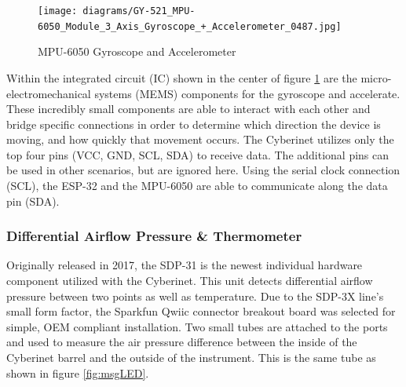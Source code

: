 \begin{center}
    \begin{figure}
        \centering
        \texttt{[image: diagrams/GY-521\_MPU-6050\_Module\_3\_Axis\_Gyroscope\_+\_Accelerometer\_0487.jpg]}
        \caption{MPU-6050 Gyroscope and Accelerometer}
        \label{fig:6050}
    \end{figure}
\end{center}

Within the integrated circuit (IC) shown in the center of figure \ref{fig:6050} are the micro-electromechanical systems (MEMS) components for the gyroscope and accelerate. These incredibly small components are able to interact with each other and bridge specific connections in order to determine which direction the device is moving, and how quickly that movement occurs\cite{6050HowTo}. The Cyberinet utilizes only the top four pins (VCC, GND, SCL, SDA) to receive data. The additional pins can be used in other scenarios, but are ignored here. Using the serial clock connection (SCL), the ESP-32 and the MPU-6050 are able to communicate along the data pin (SDA).  


\subsubsection{Differential Airflow Pressure \& Thermometer}

Originally released in 2017, the SDP-31 is the newest individual hardware component utilized with the Cyberinet. This unit detects differential airflow pressure between two points as well as temperature. Due to the SDP-3X line’s small form factor, the Sparkfun Qwiic connector breakout board was selected for simple, OEM compliant installation. Two small tubes are attached to the ports and used to measure the air pressure difference between the inside of the Cyberinet barrel and the outside of the instrument. This is the same tube as shown in figure \ref{fig:msgLED}.

